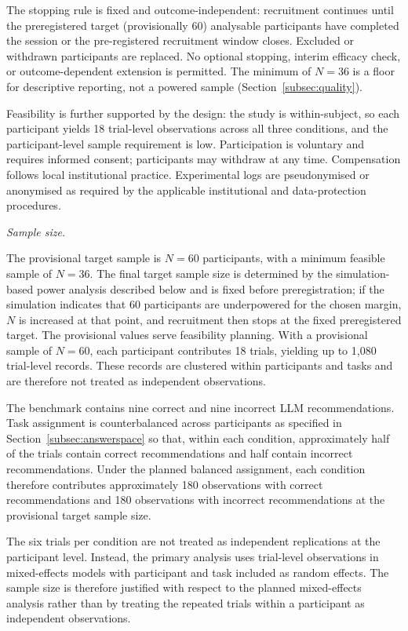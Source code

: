 \documentclass[oneside,final,14pt,a4paper]{extreport}
\begin{document}
The stopping rule is fixed and outcome-independent: recruitment continues
until the preregistered target (provisionally 60) analysable participants have
completed the session or the pre-registered recruitment window closes. Excluded or withdrawn participants
are replaced. No optional stopping, interim efficacy check, or
outcome-dependent extension is permitted. The minimum of $N=36$ is a floor for
descriptive reporting, not a powered sample (Section~\ref{subsec:quality}).

Feasibility is further supported by the design: the study is within-subject, so
each participant yields 18 trial-level observations across all three conditions,
and the participant-level sample requirement is low. Participation is voluntary
and requires informed consent; participants may withdraw at any time.
Compensation follows local institutional practice. Experimental logs are
pseudonymised or anonymised as required by the applicable institutional and
data-protection procedures.

\emph{Sample size.}

The provisional target sample is $N=60$ participants, with a minimum feasible
sample of $N=36$. The final target sample size is determined by the
simulation-based power analysis described below and is fixed before
preregistration; if the simulation indicates that 60 participants are
underpowered for the chosen margin, $N$ is increased at that point, and
recruitment then stops at the fixed preregistered target. The provisional
values serve feasibility planning.
With a provisional sample of \(N=60\), each participant contributes 18 trials,
yielding up to 1,080 trial-level records. These records are clustered 
within participants and tasks and are therefore not treated as independent 
observations.

The benchmark contains nine correct and nine incorrect LLM recommendations.
Task assignment is counterbalanced across participants as specified in
Section~\ref{subsec:answerspace} so that, within each condition,
approximately half of the trials contain correct recommendations and half
contain incorrect recommendations. Under the planned balanced assignment,
each condition therefore contributes approximately 180 observations with
correct recommendations and 180 observations with incorrect recommendations
at the provisional target sample size.

The six trials per condition are not treated as independent replications at
the participant level. Instead, the primary analysis uses trial-level
observations in mixed-effects models with participant and task included as
random effects. The sample size is therefore justified with respect to the
planned mixed-effects analysis rather than by treating the repeated trials
within a participant as independent observations.
\end{document}
